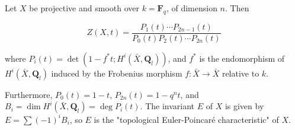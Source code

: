 Let $X$ be projective and smooth over $k = \mathbf{F}_q$, of dimension $n$. Then

$$Z(X,t) = \frac{P_1(t) \cdots P_{2n-1}(t)}{P_0(t) P_2(t) \cdots P_{2n}(t)}$$

where $P_i(t) = \det(1 - f^* t; H^i(\bar{X}, \mathbf{Q}_l))$, and $f^*$ is the endomorphism of $H^i(\bar{X}, \mathbf{Q}_l)$ induced by the Frobenius morphism $f: \bar{X} \rightarrow \bar{X}$ relative to $k$.

Furthermore, $P_0(t) = 1-t$, $P_{2n}(t) = 1 - q^n t$, and $B_i = \dim H^i(\bar{X}, \mathbf{Q}_l) = \deg P_i(t)$. The invariant $E$ of $X$ is given by $E = \sum (-1)^i B_i$, so $E$ is the "topological Euler-Poincaré characteristic" of $X$.
